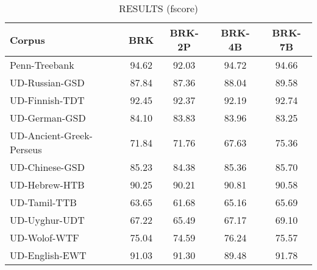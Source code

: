 
\begin{table}[h]
    \centering
    \caption{RESULTS (fscore)}
    \label{tab:scores}
    
    \begin{tabular}{lcccc}
        \hline
        \textbf{Corpus}                & \textbf{BRK} & \textbf{BRK-2P} & \textbf{BRK-4B} & \textbf{BRK-7B} \\ 
        \hline
        Penn-Treebank                  & 94.62        & 92.03           & 94.72           & 94.66           \\
        UD-Russian-GSD                 & 87.84        & 87.36           & 88.04           & 89.58           \\
        UD-Finnish-TDT                 & 92.45        & 92.37           & 92.19           & 92.74           \\
        UD-German-GSD                  & 84.10        & 83.83           & 83.96           & 83.25           \\
        UD-Ancient-Greek-Perseus       & 71.84        & 71.76           & 67.63           & 75.36           \\
        UD-Chinese-GSD                 & 85.23        & 84.38           & 85.36           & 85.70           \\
        UD-Hebrew-HTB                  & 90.25        & 90.21           & 90.81           & 90.58           \\  
        UD-Tamil-TTB                   & 63.65        & 61.68           & 65.16           & 65.69           \\
        UD-Uyghur-UDT                  & 67.22        & 65.49           & 67.17           & 69.10           \\
        UD-Wolof-WTF                   & 75.04        & 74.59           & 76.24           & 75.57           \\
        UD-English-EWT                 & 91.03        & 91.30           & 89.48           & 91.78           \\
        \hline

    \end{tabular}
\end{table}


